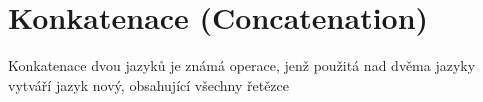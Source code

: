 \section{Konkatenace (Concatenation)}
Konkatenace dvou jazyků je známá operace, jenž použitá nad dvěma jazyky vytváří jazyk nový, obsahující všechny řetězce 